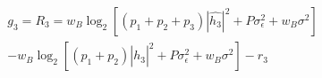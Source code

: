 \documentclass[preview]{standalone}
\begin{document}
\begin{align*}
g_3 = R_3 = w_B \log_2 \left[(p_1 + p_2 + p_3) \left|\hat{h_3}\right|^2 + P \sigma_{\epsilon}^2 + w_B \sigma^2\right] \\ - w_B \log_2 \left[(p_1 + p_2) \left|\hat{h_3}\right|^2 + P \sigma_{\epsilon}^2 + w_B \sigma^2\right] - r_3
\end{align*}
\end{document}

